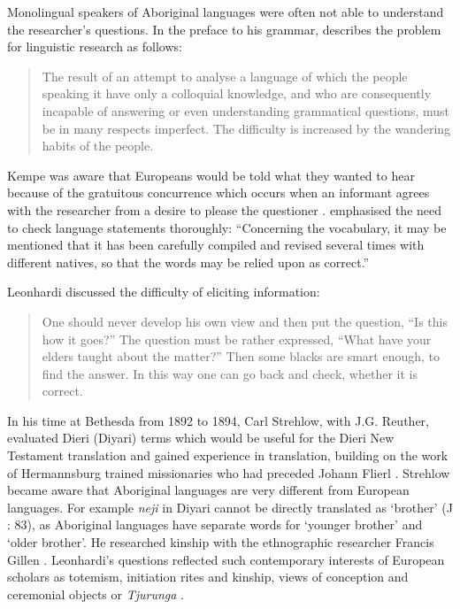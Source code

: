 \documentclass[output=paper]{langsci/langscibook}
\begin{document}
Monolingual speakers of Aboriginal languages were often not able to understand the researcher’s questions. In the preface to his grammar, \citet[1]{kempe_grammar_1891} describes the problem for linguistic research as follows: 

\begin{quote}
    The result of an attempt to analyse a language of which the people speaking it have only a colloquial knowledge, and who are consequently incapable of answering or even understanding grammatical questions, must be in many respects imperfect. The difficulty is increased by the wandering habits of the people. 
\end{quote}

Kempe was aware that Europeans would be told what they wanted to hear because of the gratuitous concurrence which occurs when an informant agrees with the researcher from a desire to please the questioner \citep[198]{liberman_understanding_1985}. \citet[1]{kempe_grammar_1891} emphasised the need to check language statements thoroughly: “Concerning the vocabulary, it may be mentioned that it has been carefully compiled and revised several times with different natives, so that the words may be relied upon as correct.” 

Leonhardi discussed the difficulty of eliciting information:

\begin{quote}
    One should never develop his own view and then put the question, “Is this how it goes?” The question must be rather expressed, “What have your elders taught about the matter?” Then some blacks are smart enough, to find the answer. In this way one can go back and check, whether it is correct. \citep[286]{leonhardi_uber_1907}
\end{quote}

In his time at Bethesda from 1892 to 1894, Carl Strehlow, with J.G. Reuther, evaluated Dieri (Diyari) terms which would be useful for the Dieri New Testament translation and gained experience in translation, building on the work of Hermannsburg trained missionaries who had preceded Johann Flierl \citep{wendt_was_2001}. Strehlow became aware that Aboriginal languages are very different from European languages. For example \textit{neji} in Diyari cannot be directly translated as ‘brother’ (J \citealt[83]{Strehlow2004}: 83), as Aboriginal languages have separate words for ‘younger brother’ and ‘older brother’. He researched kinship with the ethnographic researcher Francis Gillen \citep{mulvaney_my_1997}. Leonhardi’s questions reflected such contemporary interests of European scholars as totemism, initiation rites and kinship, views of conception and ceremonial objects or \textit{Tjurunga} \citep{schmidt_stellung_1908}. 
\end{document}
